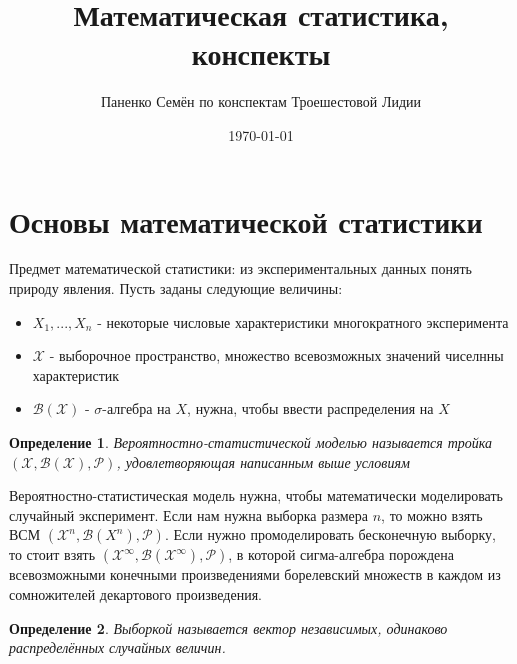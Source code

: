 \documentclass[a4paper,12pt]{article}
\author{Паненко Семён по конспектам Троешестовой Лидии}
\title{Математическая статистика, конспекты}
\date{\today}
\newtheorem{dfn}{Определение}[section]
\theoremstyle{named}
\begin{document}
\maketitle
\tableofcontents
\section{Основы математической статистики}
Предмет математической статистики: из экспериментальных данных понять природу явления.
Пусть заданы следующие величины:
\begin{itemize}
    \item $X_1, ..., X_n$ - некоторые числовые характеристики многократного эксперимента
    \item $\mathcal{X} $ - выборочное пространство, множество всевозможных значений чиселнны характеристик
    \item $\mathcal{B(X)}$ - $\sigma$-алгебра на $X$, нужна, чтобы ввести распределения на $X$
\end{itemize}
\begin{dfn}
    Вероятностно-статистической моделью называется тройка $(\mathcal{X}, \mathcal{B(X)}, \mathcal{P})$, удовлетворяющая 
    написанным выше условиям
\end{dfn}
Вероятностно-статистическая модель нужна, чтобы математически моделировать случайный эксперимент. Если нам нужна выборка размера 
$n$, то можно взять ВСМ $(\mathcal{X}^n, \mathcal{B}(X^n), \mathcal{P})$. Если нужно промоделировать бесконечную выборку, 
то стоит взять $(\mathcal{X}^\infty, \mathcal{B(X^\infty)}, \mathcal{P})$, в которой сигма-алгебра порождена всевозможными конечными 
произведениями борелевский множеств в каждом из сомножителей декартового произведения. 
\begin{dfn}
    Выборкой называется вектор независимых, одинаково распределённых случайных величин.
\end{dfn}
\end{document}
